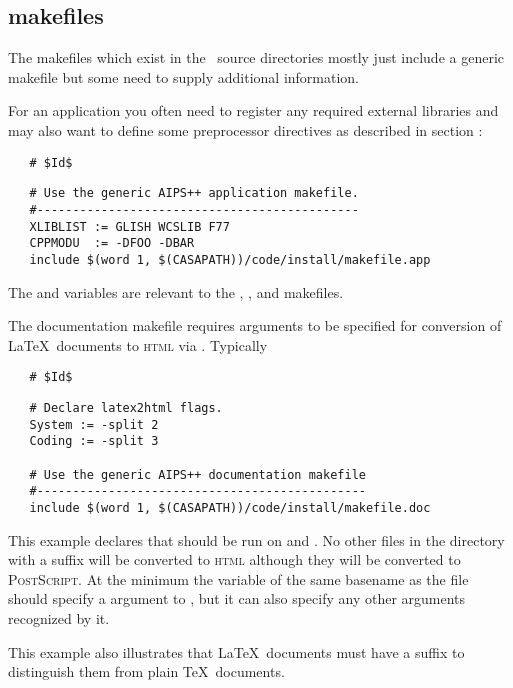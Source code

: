\subsection*{makefiles}

The makefiles which exist in the \aipspp\ source directories mostly just
include a generic makefile but some need to supply additional information.

For an application you often need to register any required external libraries
and may also want to define some preprocessor directives as described in
section :

\noindent
\verb+   # $+\verb+Id$+

\begin{verbatim}
   # Use the generic AIPS++ application makefile.
   #---------------------------------------------
   XLIBLIST := GLISH WCSLIB F77
   CPPMODU  := -DFOO -DBAR
   include $(word 1, $(CASAPATH))/code/install/makefile.app
\end{verbatim}

\noindent
The  and  variables are relevant to the
, , and  makefiles.

The documentation makefile requires arguments to be specified for conversion
of \LaTeX\ documents to \textsc{html} via .  Typically

\noindent
\verb+   # $+\verb+Id$+

\begin{verbatim}
   # Declare latex2html flags.
   System := -split 2
   Coding := -split 3

   # Use the generic AIPS++ documentation makefile
   #----------------------------------------------
   include $(word 1, $(CASAPATH))/code/install/makefile.doc
\end{verbatim}

\noindent
This example declares that  should be run on
 and .  No other files in the directory
with a  suffix will be converted to \textsc{html} although they
will be converted to \textsc{PostScript}.  At the minimum the variable of
the same basename as the  file should specify a 
argument to , but it can also specify any other arguments
recognized by it.

This example also illustrates that \LaTeX\ documents must have a 
suffix to distinguish them from plain \TeX\ documents.

